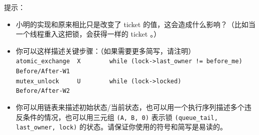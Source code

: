 \documentclass[a4paper,12pt]{article}
\begin{document}
提示：

\begin{itemize}
  \item 小明的实现和原来相比只是改变了 ticket 的值，这会造成什么影响？（比如当一个线程重入这把锁，会获得一样的 ticket 。）
  \item 你可以这样描述关键步骤：（如果需要更多简写，请注明） \\
  \small\verb|atomic_exchange  X		while (lock->last_owner != before_me) Before/After-W1| \\
  \small\verb|mutex_unlock     U		while (lock->locked) 				 Before/After-W2|
  \item 你可以用链表来描述初始状态/当前状态，也可以用一个执行序列描述多个违反条件的情况，也可以用三元组 \verb|(A, B, 0)| 表示锁 \verb|(queue_tail, last_owner, lock)| 的状态。请保证你使用的符号和简写是易读的。
\end{itemize}

\begin{answer}
  \lipsum[3]
\end{answer}

\label{LastPage}
\end{document}
